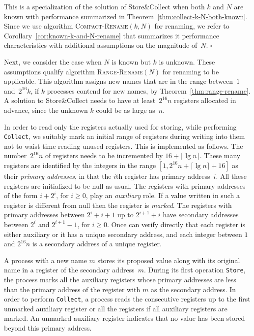 \documentclass[11pt]{article}
\newcommand{\qed}{\hfill $\square$ \smallbreak}
\newenvironment{proof}{\noindent{\bf Proof:}}{\qed}
\begin{document}
\begin{proof}
This is a specialization of the solution of Store\&Collect when both $k$ and $N$ are known with performance summarized in Theorem~\ref{thm:collect-k-N-both-known}.
Since we use algorithm \textsc{Compact-Rename}$(k,N)$ for renaming, we refer to Corollary~\ref{cor:known-k-and-N-rename} that summarizes it performance characteristics with additional assumptions on the magnitude of~$N$.
\end{proof}



Next, we consider the case when $N$ is known but $k$ is unknown.
These assumptions qualify algorithm \textsc{Range-Rename}$(N)$ for renaming to be applicable.
This algorithm assigns new names that are in the range between~$1$ and~$2^{16} k$, if $k$ processes contend for new names, by Theorem~\ref{thm:range-rename}.
A solution to Store\&Collect needs to have at least~$2^{16} n$ registers allocated in advance, since the unknown $k$ could be as large as~$n$.

In order to read only the registers actually used for storing, while performing \texttt{Collect}, we suitably mark an initial range of registers during writing into them not to waist time reading unused registers.
This is implemented as follows.
The number~$2^{16} n$ of registers needs to be incremented by $16+\lceil \lg n\rceil$. 
These many registers are identified by the integers in the range $[1,2^{16} n + \lceil \lg n\rceil+16]$ as their \emph{primary addresses}, in that the $i$th register has primary address~$i$.
All these registers are initialized to be null as usual. 
The registers with primary addresses of the form $i+2^i$, for $i\ge 0$, play an \emph{auxiliary} role.
If a value written in such a register is different from null then the register is \emph{marked}. 
The registers with primary addresses between $2^i+i+1$ up to $2^{i+1}+i$ have secondary addresses between $2^i$ and $2^{i+1}-1$, for $i\ge 0$.
Once can verify directly that each register is either auxiliary or it has a unique secondary address, and each integer between $1$ and $2^{16}n$ is a secondary address of a unique register. 

A process with a new name $m$ stores its proposed value along with its original name in a register of the secondary address~$m$.
During its first operation \texttt{Store}, the process marks all the auxiliary registers whose primary addresses are less than the primary address of the register with $m$ as the secondary address.
In order to perform \texttt{Collect}, a process reads the consecutive registers up to the first unmarked auxiliary register or all the registers if all auxiliary registers are marked.
An unmarked auxiliary register indicates that no value has been stored beyond this primary address.
\end{document}
